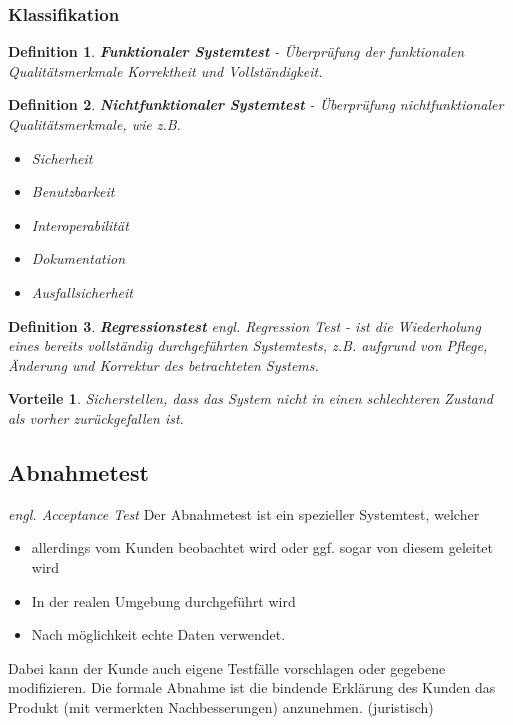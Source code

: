 \documentclass[a4paper]{article}
\theoremstyle{break}
\newtheorem{defi}{Definition}[section]
\newtheorem{why}{Vorteile}[section]
\begin{document}
          \subsubsection{Klassifikation}
          \begin{defi}
            \textbf{Funktionaler Systemtest} - Überprüfung der funktionalen Qualitätsmerkmale Korrektheit und Vollständigkeit.
          \end{defi}
          \begin{defi}
            \textbf{Nichtfunktionaler Systemtest} - Überprüfung nichtfunktionaler Qualitätsmerkmale, wie z.B.
            \begin{itemize}
            \item Sicherheit
            \item Benutzbarkeit
            \item Interoperabilität
            \item Dokumentation
            \item Ausfallsicherheit
            \end{itemize}
          \end{defi}


          \begin{defi}
            \textbf{Regressionstest} \textit{engl. Regression Test} - ist die Wiederholung eines bereits vollständig durchgeführten Systemtests, z.B. aufgrund von Pflege, Änderung und Korrektur des betrachteten Systems.
          \end{defi}

          \begin{why}
            Sicherstellen, dass das System nicht in einen schlechteren Zustand als vorher zurückgefallen ist.
          \end{why}
          
          \subsection{Abnahmetest}
          \textit{engl. Acceptance Test}
          Der Abnahmetest ist ein spezieller Systemtest, welcher
          \begin{itemize}
          \item allerdings vom Kunden beobachtet wird oder ggf. sogar von diesem geleitet wird
          \item In der realen Umgebung durchgeführt wird
          \item Nach möglichkeit echte Daten verwendet.
          \end{itemize}
          \begin{flushleft}
          Dabei kann der Kunde auch eigene Testfälle vorschlagen oder gegebene modifizieren.
          Die formale Abnahme ist die bindende Erklärung des Kunden das Produkt (mit vermerkten Nachbesserungen) anzunehmen. (juristisch)
          \end{flushleft}
          
\end{document}
